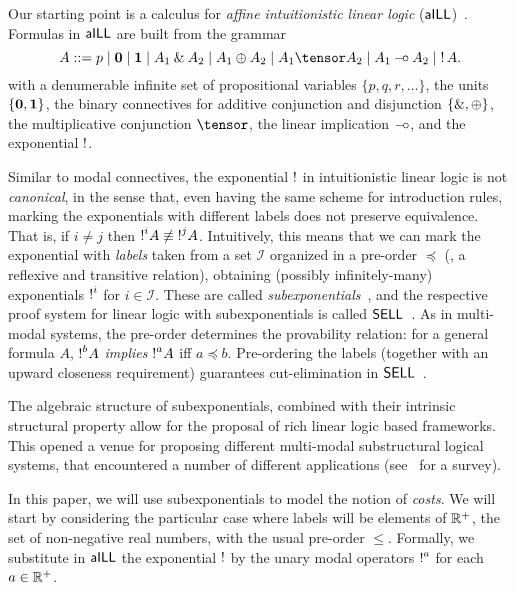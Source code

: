 
Our starting point is a calculus for \emph{affine intuitionistic linear logic} ($\textsf{aILL}$)~\cite{DBLP:journals/tcs/Girard87}. Formulas in $\textsf{aILL}$ are built from the grammar 
$$
 A ::= p \mid \zero \mid \one  
 \mid A_1 \with A_2  \mid A_1 
 \oplus A_2 \mid   A_1 \tensor A_2
  \mid A_1 \lolli A_2\mid \bang A.
$$
with a denumerable infinite set of propositional variables $\{p, q, r, \ldots\}$, the units $\{{\bf 0},{\bf 1}\}$,  the binary connectives for additive conjunction and disjunction $\{\mathbin{\&},\oplus\}$, the multiplicative conjunction $\tensor$, the  linear implication $\mathbin{-\hspace{-0.70mm}\circ}$, and the exponential $\mathop{!}$.

Similar to modal connectives, the exponential $\mathop{!}$ in intuitionistic linear logic  is not {\em canonical}, in the sense that, even having the same scheme for introduction rules, marking the exponentials with different labels  does not preserve equivalence. That is, if  $i\not= j$ then
$\hbox{$\mathop{!}^{i}$}A\not\equiv\hbox{$\mathop{!}^{j}$}A$.
%
Intuitively, this means that we can mark the exponential with {\em labels} taken from a set $\mathcal{I}$ organized in a pre-order $\preceq$ (\ie, a reflexive and transitive relation), obtaining (possibly infinitely-many) exponentials $\hbox{$\mathop{!}^{i}$}$
for $i\in\mathcal{I}$. These are called {\em subexponentials}~\cite{DBLP:conf/kgc/DanosJS93}, and the respective proof system for linear logic with subexponentials is called $\textsf{SELL}$~\cite{DBLP:journals/jar/NigamM10}.
As in multi-modal systems, the pre-order  determines the provability relation: 
for a general formula $A$, $\hbox{$\mathop{!}^{b}$}A$ {\em implies} $\hbox{$\mathop{!}^{a}$}A$ iff $a \preceq b$.
%
Pre-ordering the labels (together with an upward closeness requirement)
guarantees cut-elimination in $\textsf{SELL}$~\cite{DBLP:conf/kgc/DanosJS93}. 

The algebraic structure of subexponentials, combined with their intrinsic structural property allow for the proposal of rich linear logic based frameworks. This opened a venue for proposing different multi-modal substructural logical systems, that encountered a number of different applications (see~\cite{DBLP:conf/fscd/PimentelON21} for a survey). 

In this paper, we will use subexponentials to model the notion of {\em costs}. We will start by considering the particular case where labels will be elements of $\mathbb{R}^+$, the set of non-negative real numbers, with the usual pre-order $\leq$. Formally, we substitute in $\textsf{aILL}$
the exponential $\mathop{!}$ by the unary modal operators $\hbox{$\mathop{!}^{a}$}$ 
for each $a\in\mathbb{R}^+$. 

